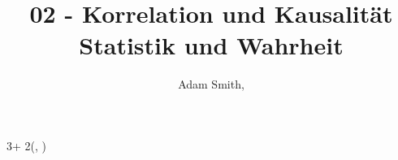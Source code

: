 \documentclass{beamer}
\title{02 - Korrelation und Kausalität \\
	\Large{Statistik und Wahrheit}}
\author{%
	Adam Smith,\affilindicator{a}
} %
\institute{%
	\affilindicator{a}\,University of Bonn, Germany
} %
\date{}
\newlength{\blockOne}
\begin{document}


\begin{frame}[t]	%





\TPshowboxestrue




\begin{textblock*}{3\colwidth + 2\colsep}(\leftmargin, \blockOne)


\end{textblock*}
\end{frame}
\end{document}
